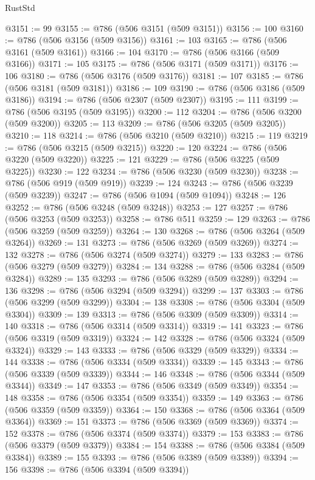 \begin{lexlean}{RustStd}
\begin{coremodule}
{\begin{coremodule}
{{{{{{{{{{{{{{{{{{{{{{{{{{{{{{{{{{{{{{{{{{{{{{{{{{{{{{{@3151 := 99
@3155 := @786 (@506 @3151 (@509 @3151))
@3156 := 100
@3160 := @786 (@506 @3156 (@509 @3156))
@3161 := 103
@3165 := @786 (@506 @3161 (@509 @3161))
@3166 := 104
@3170 := @786 (@506 @3166 (@509 @3166))
@3171 := 105
@3175 := @786 (@506 @3171 (@509 @3171))
@3176 := 106
@3180 := @786 (@506 @3176 (@509 @3176))
@3181 := 107
@3185 := @786 (@506 @3181 (@509 @3181))
@3186 := 109
@3190 := @786 (@506 @3186 (@509 @3186))
@3194 := @786 (@506 @2307 (@509 @2307))
@3195 := 111
@3199 := @786 (@506 @3195 (@509 @3195))
@3200 := 112
@3204 := @786 (@506 @3200 (@509 @3200))
@3205 := 113
@3209 := @786 (@506 @3205 (@509 @3205))
@3210 := 118
@3214 := @786 (@506 @3210 (@509 @3210))
@3215 := 119
@3219 := @786 (@506 @3215 (@509 @3215))
@3220 := 120
@3224 := @786 (@506 @3220 (@509 @3220))
@3225 := 121
@3229 := @786 (@506 @3225 (@509 @3225))
@3230 := 122
@3234 := @786 (@506 @3230 (@509 @3230))
@3238 := @786 (@506 @919 (@509 @919))
@3239 := 124
@3243 := @786 (@506 @3239 (@509 @3239))
@3247 := @786 (@506 @1094 (@509 @1094))
@3248 := 126
@3252 := @786 (@506 @3248 (@509 @3248))
@3253 := 127
@3257 := @786 (@506 @3253 (@509 @3253))
@3258 := @786 @511
@3259 := 129
@3263 := @786 (@506 @3259 (@509 @3259))
@3264 := 130
@3268 := @786 (@506 @3264 (@509 @3264))
@3269 := 131
@3273 := @786 (@506 @3269 (@509 @3269))
@3274 := 132
@3278 := @786 (@506 @3274 (@509 @3274))
@3279 := 133
@3283 := @786 (@506 @3279 (@509 @3279))
@3284 := 134
@3288 := @786 (@506 @3284 (@509 @3284))
@3289 := 135
@3293 := @786 (@506 @3289 (@509 @3289))
@3294 := 136
@3298 := @786 (@506 @3294 (@509 @3294))
@3299 := 137
@3303 := @786 (@506 @3299 (@509 @3299))
@3304 := 138
@3308 := @786 (@506 @3304 (@509 @3304))
@3309 := 139
@3313 := @786 (@506 @3309 (@509 @3309))
@3314 := 140
@3318 := @786 (@506 @3314 (@509 @3314))
@3319 := 141
@3323 := @786 (@506 @3319 (@509 @3319))
@3324 := 142
@3328 := @786 (@506 @3324 (@509 @3324))
@3329 := 143
@3333 := @786 (@506 @3329 (@509 @3329))
@3334 := 144
@3338 := @786 (@506 @3334 (@509 @3334))
@3339 := 145
@3343 := @786 (@506 @3339 (@509 @3339))
@3344 := 146
@3348 := @786 (@506 @3344 (@509 @3344))
@3349 := 147
@3353 := @786 (@506 @3349 (@509 @3349))
@3354 := 148
@3358 := @786 (@506 @3354 (@509 @3354))
@3359 := 149
@3363 := @786 (@506 @3359 (@509 @3359))
@3364 := 150
@3368 := @786 (@506 @3364 (@509 @3364))
@3369 := 151
@3373 := @786 (@506 @3369 (@509 @3369))
@3374 := 152
@3378 := @786 (@506 @3374 (@509 @3374))
@3379 := 153
@3383 := @786 (@506 @3379 (@509 @3379))
@3384 := 154
@3388 := @786 (@506 @3384 (@509 @3384))
@3389 := 155
@3393 := @786 (@506 @3389 (@509 @3389))
@3394 := 156
@3398 := @786 (@506 @3394 (@509 @3394))
}}}}}}}}}}}}}}}}}}}}}}}}}}}}}}}}}}}}}}}}}}}}}}}}}}}}}}}
\end{coremodule}}
\end{coremodule}
\end{lexlean}
